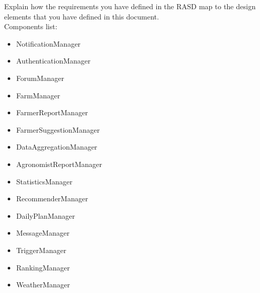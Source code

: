 \newcommand\req[1]{\item[[ R#1]]}

Explain how the requirements you have defined in the RASD map to the design elements that you have defined in this document.\\

Components list:\\

\begin{itemize}

\item NotificationManager
\item AuthenticationManager
\item ForumManager
\item FarmManager
\item FarmerReportManager
\item FarmerSuggestionManager
\item DataAggregationManager
\item AgronomistReportManager
\item StatisticsManager
\item RecommenderManager
\item DailyPlanManager
\item MessageManager
\item TriggerManager
\item RankingManager
\item WeatherManager

\end{itemize}



